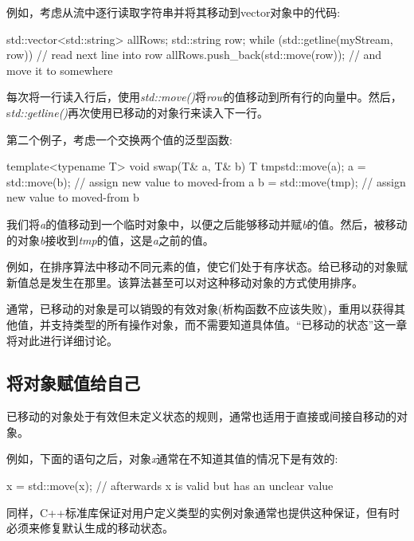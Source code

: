 例如，考虑从流中逐行读取字符串并将其移动到vector对象中的代码:

\begin{cppcode}
std::vector<std::string> allRows;
std::string row;
while (std::getline(myStream, row)) { // read next line into row
	allRows.push_back(std::move(row)); // and move it to somewhere
}
\end{cppcode}

每次将一行读入行后，使用\textit{std::move()}将\textit{row}的值移动到所有行的向量中。然后，s\textit{td::getline()}再次使用已移动的对象行来读入下一行。

第二个例子，考虑一个交换两个值的泛型函数:

\begin{cppcode}
template<typename T>
void swap(T& a, T& b)
{
	T tmp{std::move(a)};
	a = std::move(b); // assign new value to moved-from a
	b = std::move(tmp); // assign new value to moved-from b
}
\end{cppcode}

我们将\textit{a}的值移动到一个临时对象中，以便之后能够移动并赋\textit{b}的值。然后，被移动的对象\textit{b}接收到\textit{tmp}的值，这是\textit{a}之前的值。

例如，在排序算法中移动不同元素的值，使它们处于有序状态。给已移动的对象赋新值总是发生在那里。该算法甚至可以对这种移动对象的方式使用排序。

通常，已移动的对象是可以销毁的有效对象(析构函数不应该失败)，重用以获得其他值，并支持类型的所有操作对象，而不需要知道具体值。“已移动的状态”这一章将对此进行详细讨论。

\subsection{将对象赋值给自己}

已移动的对象处于有效但未定义状态的规则，通常也适用于直接或间接自移动的对象。

例如，下面的语句之后，对象\textit{x}通常在不知道其值的情况下是有效的:

\begin{cppcode}
x = std::move(x); // afterwards x is valid but has an unclear value
\end{cppcode}

同样，C++标准库保证对用户定义类型的实例对象通常也提供这种保证，但有时必须来修复默认生成的移动状态。


